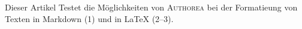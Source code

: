 Dieser Artikel Testet die Möglichkeiten von \textsc{Authorea} bei der Formatieung von Texten in Markdown (1) und in LaTeX (2–3).
